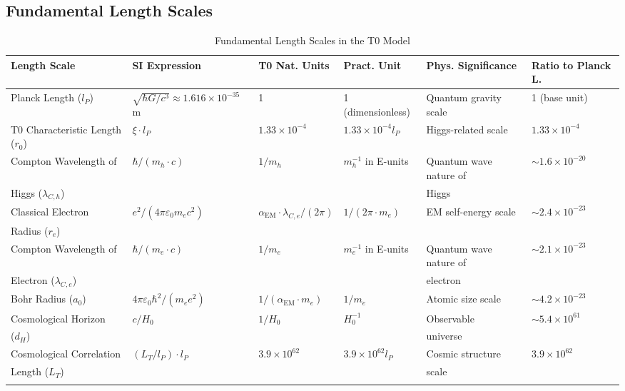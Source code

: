 \documentclass[12pt,a4paper]{article}
\newcommand{\alphaEM}{\alpha_{\text{EM}}}
\begin{document}
	\subsection{Fundamental Length Scales}
	
	\begin{table}[ht]
		\centering
		\begin{adjustbox}{scale=0.65}
			\begin{tabular}{llllll}
				\hline
				\textbf{Length Scale} & \textbf{SI Expression} & \textbf{T0 Nat. Units} & \textbf{Pract. Unit} & \textbf{Phys. Significance} & \textbf{Ratio to Planck L.} \\
				\hline
				Planck Length ($l_P$) & $\sqrt{\hbar G/c^3} \approx 1.616 \times 10^{-35}$ m & 1 & 1 (dimensionless) & Quantum gravity scale & 1 (base unit) \\
				T0 Characteristic Length ($r_0$) & $\xi \cdot l_P$ & $1.33 \times 10^{-4}$ & $1.33 \times 10^{-4} l_P$ & Higgs-related scale & $1.33 \times 10^{-4}$ \\
				Compton Wavelength of & $\hbar/(m_h \cdot c)$ & $1/m_h$ & $m_h^{-1}$ in E-units & Quantum wave nature of & $\sim 1.6 \times 10^{-20}$ \\
				Higgs ($\lambda_{C,h}$) & & & & Higgs & \\
				Classical Electron & $e^2/(4\pi\varepsilon_0m_e c^2)$ & $\alphaEM \cdot \lambda_{C,e}/(2\pi)$ & $1/(2\pi \cdot m_e)$ & EM self-energy scale & $\sim 2.4 \times 10^{-23}$ \\
				Radius ($r_e$) & & & & & \\
				Compton Wavelength of & $\hbar/(m_e \cdot c)$ & $1/m_e$ & $m_e^{-1}$ in E-units & Quantum wave nature of & $\sim 2.1 \times 10^{-23}$ \\
				Electron ($\lambda_{C,e}$) & & & & electron & \\
				Bohr Radius ($a_0$) & $4\pi\varepsilon_0\hbar^2/(m_e e^2)$ & $1/(\alphaEM \cdot m_e)$ & $1/m_e$ & Atomic size scale & $\sim 4.2 \times 10^{-23}$ \\
				Cosmological Horizon & $c/H_0$ & $1/H_0$ & $H_0^{-1}$ & Observable & $\sim 5.4 \times 10^{61}$ \\
				($d_H$) & & & & universe & \\
				Cosmological Correlation & $(L_T/l_P) \cdot l_P$ & $3.9 \times 10^{62}$ & $3.9 \times 10^{62} l_P$ & Cosmic structure & $3.9 \times 10^{62}$ \\
				Length ($L_T$) & & & & scale & \\
				\hline
				\multicolumn{5}{c}{} \\
				\hline
			\end{tabular}
		\end{adjustbox}
		\caption{Fundamental Length Scales in the T0 Model}
		\label{tab:length_scales}
	\end{table}
	
\end{document}
